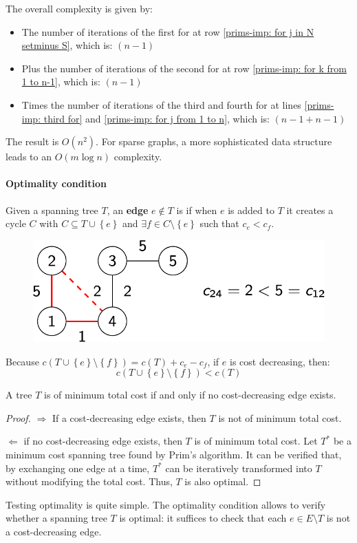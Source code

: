 The overall complexity is given by:
\begin{itemize}
    \item The number of iterations of the first for at row \ref{prims-imp: for j in N setminus S}, which is: $\left(n-1\right)$

    \item Plus the number of iterations of the second for at row \ref{prims-imp: for k from 1 to n-1}, which is: $\left(n-1\right)$
    
    \item Times the number of iterations of the third and fourth for at lines \ref{prims-imp: third for} and \ref{prims-imp: for j from 1 to n}, which is: $\left(n-1+n-1\right)$
\end{itemize}
The result is $O\left(n^{2}\right)$. For sparse graphs, a more sophisticated data structure leads to an $O\left(m \log n\right)$ complexity.

\longline

\paragraph{Optimality condition}

Given a spanning tree $T$, an \textbf{edge} $e \notin T$ is  if when $e$ is added to $T$ it creates a cycle $C$ with $C \subseteq T \cup \left\{e\right\}$ and $\exists f \in C \setminus \left\{e\right\}$ such that $c_{e} < c_{f}$.
\begin{figure}[!htp]
    \centering
    \includegraphics[width=.5\textwidth]{img/trees-opt-condition.pdf}
\end{figure}

\noindent
Because $c\left(T \cup \left\{e\right\} \setminus \left\{f\right\}\right) = c\left(T\right) + c_{e} - c_{f}$, if $e$ is cost decreasing, then:
\begin{equation*}
    c\left(T \cup \left\{e\right\} \setminus \left\{f\right\}\right) < c\left(T\right)
\end{equation*}
\begin{theorem}
    A tree $T$ is of minimum total cost if and only if no cost-decreasing edge exists.
\end{theorem}
\begin{proof}
    $\Rightarrow$ If a cost-decreasing edge exists, then $T$ is not of minimum total cost.

    $\Leftarrow$ if no cost-decreasing edge exists, then $T$ is of minimum total cost. Let $T^{*}$ be a minimum cost spanning tree found by Prim's algorithm. It can be verified that, by exchanging one edge at a time, $T^{*}$ can be iteratively transformed into $T$ without modifying the total cost. Thus, $T$ is also optimal.
\end{proof}

\noindent
Testing optimality is quite simple. The optimality condition allows to verify whether a spanning tree $T$ is optimal: it suffices to check that each $e \in E \setminus T$ is not a cost-decreasing edge.